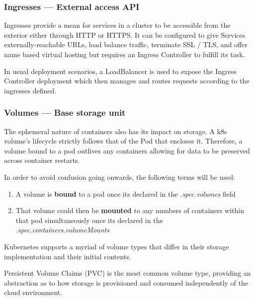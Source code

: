 \documentclass[11pt]{article}
\begin{document}
\subsubsection{Ingresses — External access API} \label{sec:ingress}

\hspace{5mm} Ingresses provide a mean for services in a cluster to be accessible from the exterior either through HTTP or HTTPS. It can be configured to give Services externally-reachable URLs, load balance traffic, terminate SSL / TLS, and offer name based virtual hosting but requires an Ingress Controller to fulfill its task.

In usual deployment scenarios, a LoadBalancer is used to expose the Ingress Controller deployment which then manages and routes requests according to the ingresses defined.  

\subsubsection{Volumes — Base storage unit} \label{sec:k8s_volumes}
\hspace{5mm} The ephemeral nature of containers also has its impact on storage. A k8s volume's lifecycle strictly follows that of the Pod that encloses it. Therefore, a volume bound to a pod outlives any containers allowing for data to be preserved across container restarts. 

In order to avoid confusion going onwards, the following terms will be used:
\begin{enumerate}
    \item A volume is \textbf{bound} to a pod once its declared in the \textit{.spec.volumes} field
    \item That volume could then be \textbf{mounted} to any numbers of containers within that pod simultaneously once its declared in the \textit{.spec.containers.volumeMounts}
\end{enumerate}

\vspace{2mm} Kubernetes supports a myriad of volume types that differ in their storage implementation and their initial contents.


\vspace{-5mm} Persistent Volume Claims (PVC) is the most common volume type, providing an abstraction as to how storage is provisioned and consumed independently of the cloud environment. 
\end{document}

